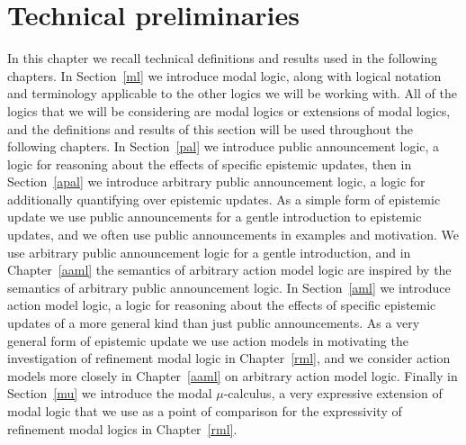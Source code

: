 \chapter{Technical preliminaries}\label{technical}

In this chapter we recall technical definitions and results used in the following chapters.
In Section~\ref{ml} we introduce modal logic, along with logical notation and terminology applicable to the other logics we will be working with.
All of the logics that we will be considering are modal logics or extensions of modal logics, and the definitions and results of this section will be used throughout the following chapters. 
In Section~\ref{pal} we introduce public announcement logic, a logic for reasoning about the effects of specific epistemic updates, then in Section~\ref{apal} we introduce arbitrary public announcement logic, a logic for additionally quantifying over epistemic updates.
As a simple form of epistemic update we use public announcements for a gentle introduction to epistemic updates, and we often use public announcements in examples and motivation.
We use arbitrary public announcement logic for a gentle introduction, and in Chapter~\ref{aaml} the semantics of arbitrary action model logic are inspired by the semantics of arbitrary public announcement logic.
In Section~\ref{aml} we introduce action model logic, a logic for reasoning about the effects of specific epistemic updates of a more general kind than just public announcements.
As a very general form of epistemic update we use action models in motivating the investigation of refinement modal logic in Chapter~\ref{rml}, and we consider action models more closely in Chapter~\ref{aaml} on arbitrary action model logic.
Finally in Section~\ref{mu} we introduce the modal $\mu$-calculus, a very expressive extension of modal logic that we use as a point of comparison for the expressivity of refinement modal logics in Chapter~\ref{rml}.







